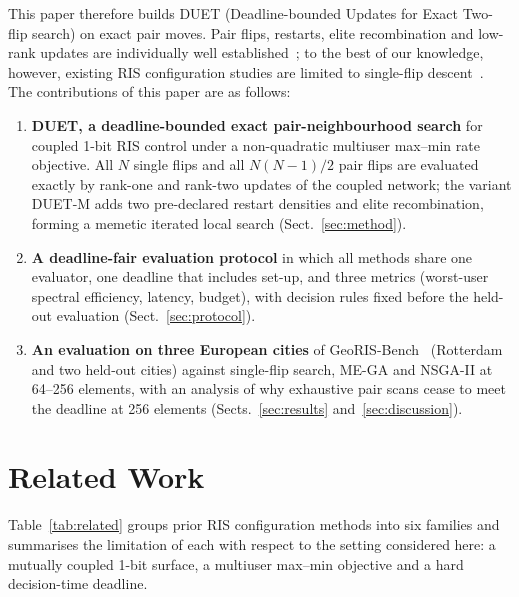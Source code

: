 \documentclass[runningheads]{llncs}
\newcommand{\duet}{\mbox{DUET}}\newcommand{\duetD}{\mbox{DUET-D}}\newcommand{\duetE}{\mbox{DUET-E}}
\newcommand{\bts}{\mbox{DUET-M}}
\begin{document}
This paper therefore builds \duet{} (Deadline-bounded Updates for Exact Two-flip search) on exact pair moves. Pair flips, restarts, elite recombination and low-rank updates are individually well established~\cite{merz2002bqp,lourenco2010ils,merz2004memetic,prodhomme2023efficient}; to the best of our knowledge, however, existing RIS configuration studies are limited to single-flip descent~\cite{hammami2026statistical}. The contributions of this paper are as follows:
\begin{enumerate}
\item \textbf{\duet{}, a deadline-bounded exact pair-neighbourhood search} for coupled 1-bit RIS control under a non-quadratic multiuser max--min rate objective. All $N$ single flips and all $N(N-1)/2$ pair flips are evaluated exactly by rank-one and rank-two updates of the coupled network; the variant \bts{} adds two pre-declared restart densities and elite recombination, forming a memetic iterated local search (Sect.~\ref{sec:method}).
\item \textbf{A deadline-fair evaluation protocol} in which all methods share one evaluator, one deadline that includes set-up, and three metrics (worst-user spectral efficiency, latency, budget), with decision rules fixed before the held-out evaluation (Sect.~\ref{sec:protocol}).
\item \textbf{An evaluation on three European cities} of GeoRIS-Bench~\cite{georisbench} (Rotterdam and two held-out cities) against single-flip search, ME-GA and NSGA-II at 64--256 elements, with an analysis of why exhaustive pair scans cease to meet the deadline at 256 elements (Sects.~\ref{sec:results} and~\ref{sec:discussion}).
\end{enumerate}

\section{Related Work}\label{sec:related}
Table~\ref{tab:related} groups prior RIS configuration methods into six families and summarises the limitation of each with respect to the setting considered here: a mutually coupled 1-bit surface, a multiuser max--min objective and a hard decision-time deadline.
\end{document}
